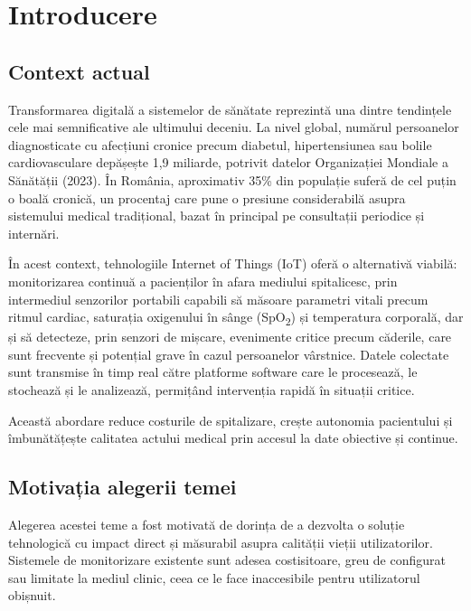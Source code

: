 \documentclass[12pt,a4paper]{article}
\newcommand{\spo}{SpO\textsubscript{2}}
\begin{document}
\newpage

\section{Introducere}

\subsection{Context actual}

Transformarea digitală a sistemelor de sănătate reprezintă una dintre tendințele cele mai semnificative ale ultimului deceniu. La nivel global, numărul persoanelor diagnosticate cu afecțiuni cronice precum diabetul, hipertensiunea sau bolile cardiovasculare depășește 1,9 miliarde, potrivit datelor Organizației Mondiale a Sănătății (2023). În România, aproximativ 35\% din populație suferă de cel puțin o boală cronică, un procentaj care pune o presiune considerabilă asupra sistemului medical tradițional, bazat în principal pe consultații periodice și internări.

În acest context, tehnologiile Internet of Things (IoT) oferă o alternativă viabilă: monitorizarea continuă a pacienților în afara mediului spitalicesc, prin intermediul senzorilor portabili capabili să măsoare parametri vitali precum ritmul cardiac, saturația oxigenului în sânge (\spo) și temperatura corporală, dar și să detecteze, prin senzori de mișcare, evenimente critice precum căderile, care sunt frecvente și potențial grave în cazul persoanelor vârstnice. Datele colectate sunt transmise în timp real către platforme software care le procesează, le stochează și le analizează, permițând intervenția rapidă în situații critice.

Această abordare reduce costurile de spitalizare, crește autonomia pacientului și îmbunătățește calitatea actului medical prin accesul la date obiective și continue.

\subsection{Motivația alegerii temei}

Alegerea acestei teme a fost motivată de dorința de a dezvolta o soluție tehnologică cu impact direct și măsurabil asupra calității vieții utilizatorilor. Sistemele de monitorizare existente sunt adesea costisitoare, greu de configurat sau limitate la mediul clinic, ceea ce le face inaccesibile pentru utilizatorul obișnuit.
\end{document}
